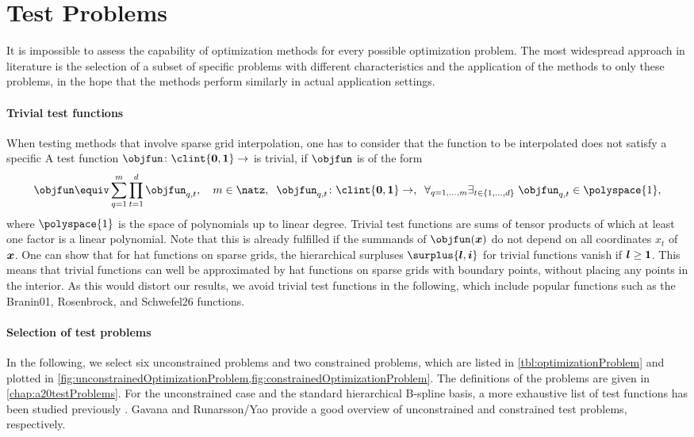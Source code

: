 \section{Test Problems}
\label{sec:53testProblems}

It is impossible to assess the capability of optimization methods
for every possible optimization problem.
The most widespread approach in literature
is the selection of a subset of specific problems
with different characteristics  and
the application of the methods to only these problems,
in the hope that the methods perform similarly in
actual application settings.

\paragraph{Trivial test functions}

When testing methods that involve sparse grid interpolation,
one has to consider that the function to be interpolated
does not satisfy a specific 
A test function $\objfun\colon \clint{\*0, \*1} \to \real$ is trivial, if
$\objfun$ is of the form
\begin{equation}
  \objfun \equiv \sum_{q=1}^m \prod_{t=1}^d \objfun_{q,t},\quad
  m \in \natz,\;\;
  \objfun_{q,t}\colon \clint{\*0, \*1} \to \real,\;\;
  \faex{q = 1, \dotsc, m}{t \in \{1, \dotsc, d\}}{
    \objfun_{q,t} \in \polyspace{1},
  }
\end{equation}
where $\polyspace{1}$ is the space of polynomials up to linear degree.
Trivial test functions are sums of tensor products of which at
least one factor is a linear polynomial.
Note that this is already fulfilled if the summands of $\objfun(\*x)$
do not depend on all coordinates $x_t$ of ${\boldsymbol{x}}$.
One can show that for hat functions on sparse grids,
the hierarchical surpluses $\surplus{\*l,\*i}$ for trivial functions
vanish if ${\boldsymbol{l}} \ge {\boldsymbol{1}}$.
This means that trivial functions can well be approximated by hat functions
on sparse grids with boundary points, without placing any points
in the interior.
As this would distort our results,
we avoid trivial test functions in the following,
which include popular functions such as the
Branin01, Rosenbrock, and Schwefel26 functions.

\paragraph{Selection of test problems}

In the following, we select six unconstrained problems
and two constrained problems, which are listed in
\cref{tbl:optimizationProblem} and plotted in
\cref{fig:unconstrainedOptimizationProblem,fig:constrainedOptimizationProblem}.
The definitions of the problems are given in \cref{chap:a20testProblems}.
For the unconstrained case and the standard hierarchical
B-spline basis, a more exhaustive list of test functions has been
studied previously \cite{Valentin14Hierarchische}.
Gavana \cite{Gavana13Global} and Runarsson/Yao \cite{Runarsson00Stochastic}
provide a good overview of unconstrained and constrained test problems,
respectively.

